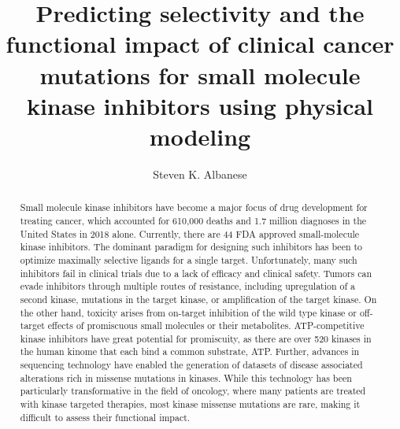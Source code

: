 \documentclass[phd,tocprelim]{cornell}
\title {Predicting selectivity and the functional impact of clinical cancer mutations for small molecule kinase inhibitors using physical modeling}
\author {Steven K. Albanese}
\begin{document}
\maketitle
\makecopyright

\begin{abstract}
Small molecule kinase inhibitors have become a major focus of drug development for treating cancer, which accounted for 610,000 deaths and 1.7 million diagnoses in the United States in 2018 alone. Currently, there are 44 FDA approved small-molecule kinase inhibitors. The dominant paradigm for designing such inhibitors has been to optimize maximally selective ligands for a single target. Unfortunately, many such inhibitors fail in clinical trials due to a lack of efficacy and clinical safety. Tumors can evade inhibitors through multiple routes of resistance, including upregulation of a second kinase, mutations in the target kinase, or amplification of the target kinase. On the other hand, toxicity arises from on-target inhibition of the wild type kinase or off-target effects of promiscuous small molecules or their metabolites. ATP-competitive kinase inhibitors have great potential for promiscuity, as there are over 520 kinases in the human kinome that each bind a common substrate, ATP.  Further, advances in sequencing technology have enabled the generation of datasets of disease associated alterations rich in missense mutations in kinases. While this technology has been particularly transformative in the field of oncology, where many patients are treated with kinase targeted therapies, most kinase missense mutations are rare, making it difficult to assess their functional impact. 

\end{abstract}
\end{document}
